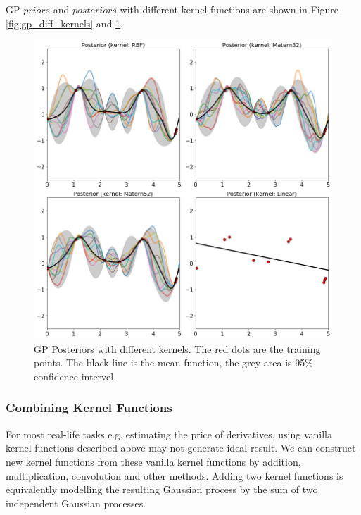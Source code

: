 \documentclass[11pt,a4paper]{article}
\theoremstyle{definition}
\numberwithin{equation}{section}
\begin{document}
	GP $priors$ and $posteriors$ with different kernel functions are shown in Figure \ref{fig:gp_diff_kernels} and \ref{fig:gp_diff_kernels_2}.
	
	\begin{figure}[h!]
		\centering
		\includegraphics[width=.9\linewidth]{posterior_diff_kernels.png}
		\caption{GP Posteriors with different kernels. The red dots are the training points. The black line is the mean function, the grey area is 95\% confidence intervel.}
		\label{fig:gp_diff_kernels_2}
	\end{figure}
	
	\subsubsection*{Combining Kernel Functions}
	For most real-life tasks e.g. estimating the price of derivatives, using vanilla kernel functions described above may not generate ideal result. We can construct new kernel functions from these vanilla kernel functions by addition, multiplication, convolution and other methods. Adding two kernel functions is equivalently modelling the resulting Gaussian process by the sum of two independent Gaussian processes\cite[sec 4.2]{RandW}.
	
\end{document}
